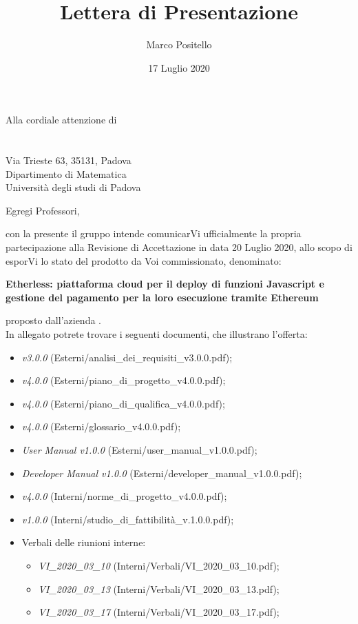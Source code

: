 \documentclass[a4paper]{letter}
\title{Lettera di Presentazione}
\author{Marco Positello}
\begin{document}
\begin{letter} {Alla cordiale attenzione di \\ \TV \\ \RC \\ Via Trieste 63, 35131, Padova\\ Dipartimento di Matematica \\ Università degli studi di Padova }
  \vspace*{-0.4\baselineskip}
\date{17 Luglio 2020}
\opening{Egregi Professori,}
con la presente il gruppo \Gruppo{} intende comunicarVi ufficialmente la propria partecipazione alla Revisione di Accettazione in data 20 Luglio 2020, allo scopo di esporVi lo stato del prodotto da Voi commissionato, denominato:
  \begin{center}
    \textbf{Etherless: piattaforma cloud per il deploy di funzioni Javascript e gestione del pagamento per la loro esecuzione tramite Ethereum}
  \end{center}
  proposto dall'azienda \Proponente.\\
  In allegato potrete trovare i seguenti documenti, che illustrano l'offerta:
  \begin{itemize}
    \item \AdR{} \textit{v3.0.0} (Esterni/analisi\_dei\_requisiti\_v3.0.0.pdf);
    \item \PdP{} \textit{v4.0.0} (Esterni/piano\_di\_progetto\_v4.0.0.pdf);
    \item \PdQ{} \textit{v4.0.0} (Esterni/piano\_di\_qualifica\_v4.0.0.pdf);
    \item \Glossario{} \textit{v4.0.0} (Esterni/glossario\_v4.0.0.pdf);
		\item \textit{User Manual v1.0.0} (Esterni/user\_manual\_v1.0.0.pdf);
		\item \textit{Developer Manual v1.0.0} (Esterni/developer\_manual\_v1.0.0.pdf);
    \item \NdP{} \textit{v4.0.0} (Interni/norme\_di\_progetto\_v4.0.0.pdf);
    \item \SdF{} \textit{v1.0.0} (Interni/studio\_di\_fattibilità\_v.1.0.0.pdf);
    \item Verbali delle riunioni interne:
      \begin{itemize}
      				\item \textit{VI\_2020\_03\_10} (Interni/Verbali/VI\_2020\_03\_10.pdf);
				\item \textit{VI\_2020\_03\_13} (Interni/Verbali/VI\_2020\_03\_13.pdf);
				\item \textit{VI\_2020\_03\_17} (Interni/Verbali/VI\_2020\_03\_17.pdf);

\end{itemize}
\end{itemize}
\end{letter}
\end{document}
